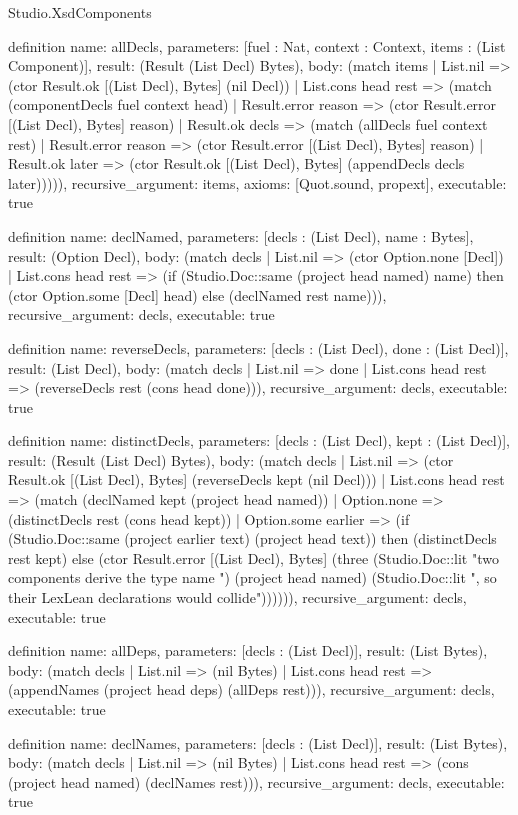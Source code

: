 \begin{lexlean}{Studio.XsdComponents}
\begin{semanticmodule}
definition{
  name: allDecls,
  parameters: [fuel : Nat, context : Context, items : (List Component)],
  result: (Result (List Decl) Bytes),
  body: (match items
    | List.nil => (ctor Result.ok [(List Decl), Bytes] (nil Decl))
    | List.cons head rest => (match (componentDecls fuel context head)
      | Result.error reason => (ctor Result.error [(List Decl), Bytes] reason)
      | Result.ok decls => (match (allDecls fuel context rest)
        | Result.error reason => (ctor Result.error [(List Decl), Bytes] reason)
        | Result.ok later => (ctor Result.ok [(List Decl), Bytes] (appendDecls decls later))))),
  recursive_argument: items,
  axioms: [Quot.sound, propext],
  executable: true
}

definition{
  name: declNamed,
  parameters: [decls : (List Decl), name : Bytes],
  result: (Option Decl),
  body: (match decls
    | List.nil => (ctor Option.none [Decl])
    | List.cons head rest => (if (Studio.Doc::same (project head named) name) then (ctor Option.some [Decl] head) else (declNamed rest name))),
  recursive_argument: decls,
  executable: true
}

definition{
  name: reverseDecls,
  parameters: [decls : (List Decl), done : (List Decl)],
  result: (List Decl),
  body: (match decls
    | List.nil => done
    | List.cons head rest => (reverseDecls rest (cons head done))),
  recursive_argument: decls,
  executable: true
}

definition{
  name: distinctDecls,
  parameters: [decls : (List Decl), kept : (List Decl)],
  result: (Result (List Decl) Bytes),
  body: (match decls
    | List.nil => (ctor Result.ok [(List Decl), Bytes] (reverseDecls kept (nil Decl)))
    | List.cons head rest => (match (declNamed kept (project head named))
      | Option.none => (distinctDecls rest (cons head kept))
      | Option.some earlier => (if (Studio.Doc::same (project earlier text) (project head text)) then (distinctDecls rest kept) else (ctor Result.error [(List Decl), Bytes] (three (Studio.Doc::lit "two components derive the type name ") (project head named) (Studio.Doc::lit ", so their LexLean declarations would collide")))))),
  recursive_argument: decls,
  executable: true
}

definition{
  name: allDeps,
  parameters: [decls : (List Decl)],
  result: (List Bytes),
  body: (match decls
    | List.nil => (nil Bytes)
    | List.cons head rest => (appendNames (project head deps) (allDeps rest))),
  recursive_argument: decls,
  executable: true
}

definition{
  name: declNames,
  parameters: [decls : (List Decl)],
  result: (List Bytes),
  body: (match decls
    | List.nil => (nil Bytes)
    | List.cons head rest => (cons (project head named) (declNames rest))),
  recursive_argument: decls,
  executable: true
}


\end{semanticmodule}
\end{lexlean}

